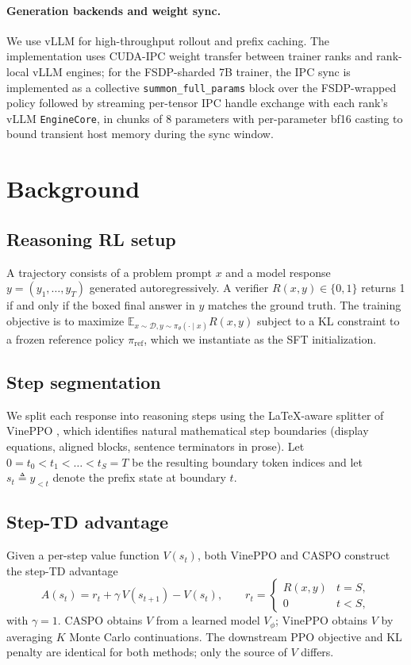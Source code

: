 \documentclass[11pt]{article}
\newcommand{\caspo}{\textsc{CASPO}}
\newcommand{\vineppo}{VinePPO}
\begin{document}
\paragraph{Generation backends and weight sync.}
We use vLLM \citep{kwon2023vllm} for high-throughput rollout and prefix
caching. The implementation uses CUDA-IPC weight transfer between trainer
ranks and rank-local vLLM engines; for the FSDP-sharded 7B trainer, the IPC
sync is implemented as a collective \texttt{summon\_full\_params} block over
the FSDP-wrapped policy followed by streaming per-tensor IPC handle exchange
with each rank's vLLM \texttt{EngineCore}, in chunks of 8 parameters with
per-parameter bf16 casting to bound transient host memory during the sync
window.

\section{Background}
\label{sec:bg}

\subsection{Reasoning RL setup}
A trajectory consists of a problem prompt $x$ and a model response
$y = (y_1, \dots, y_T)$ generated autoregressively. A verifier
$R(x,y) \in \{0,1\}$ returns 1 if and only if the boxed final answer in $y$
matches the ground truth. The training objective is to maximize
$\mathbb{E}_{x \sim \mathcal{D}, y \sim \pi_\theta(\cdot \mid x)} R(x,y)$
subject to a KL constraint to a frozen reference policy $\pi_{\mathrm{ref}}$,
which we instantiate as the SFT initialization.

\subsection{Step segmentation}
We split each response into reasoning steps using the LaTeX-aware splitter of
\vineppo{} \citep{vineppo2024,vineppocode}, which identifies natural
mathematical step boundaries (display equations, aligned blocks, sentence
terminators in prose). Let $0 = t_0 < t_1 < \dots < t_S = T$ be the resulting
boundary token indices and let $s_t \triangleq y_{<t}$ denote the prefix
state at boundary $t$.

\subsection{Step-TD advantage}
Given a per-step value function $V(s_t)$, both \vineppo{} and \caspo{}
construct the step-TD advantage
\begin{equation}
\label{eq:adv}
A(s_t) = r_t + \gamma\, V(s_{t+1}) - V(s_t),
\qquad
r_t = \begin{cases} R(x,y) & t = S, \\ 0 & t < S, \end{cases}
\end{equation}
with $\gamma = 1$. \caspo{} obtains $V$ from a learned model
$V_\phi$; \vineppo{} obtains $V$ by averaging $K$ Monte Carlo continuations.
The downstream PPO objective and KL penalty are identical for both methods;
only the source of $V$ differs.
\end{document}
